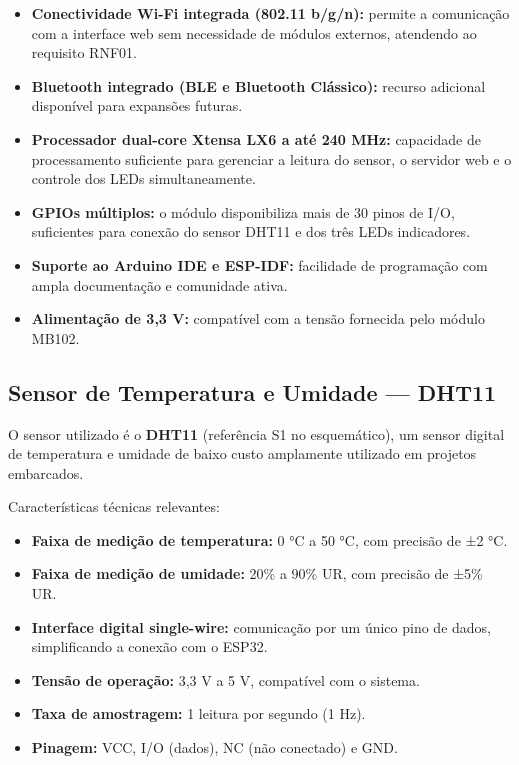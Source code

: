 \begin{itemize}
    \item \textbf{Conectividade Wi-Fi integrada (802.11 b/g/n):} permite a comunicação
    com a interface web sem necessidade de módulos externos, atendendo ao requisito RNF01.

    \item \textbf{Bluetooth integrado (BLE e Bluetooth Clássico):} recurso adicional
    disponível para expansões futuras.

    \item \textbf{Processador dual-core Xtensa LX6 a até 240 MHz:} capacidade de
    processamento suficiente para gerenciar a leitura do sensor, o servidor web e
    o controle dos LEDs simultaneamente.

    \item \textbf{GPIOs múltiplos:} o módulo disponibiliza mais de 30 pinos de I/O,
    suficientes para conexão do sensor DHT11 e dos três LEDs indicadores.

    \item \textbf{Suporte ao Arduino IDE e ESP-IDF:} facilidade de programação com
    ampla documentação e comunidade ativa.

    \item \textbf{Alimentação de 3,3 V:} compatível com a tensão fornecida pelo módulo
    MB102.
\end{itemize}

\subsection{Sensor de Temperatura e Umidade — DHT11}

O sensor utilizado é o \textbf{DHT11} (referência S1 no esquemático), um sensor digital
de temperatura e umidade de baixo custo amplamente utilizado em projetos embarcados.

Características técnicas relevantes:

\begin{itemize}
    \item \textbf{Faixa de medição de temperatura:} 0 °C a 50 °C, com precisão de ±2 °C.
    \item \textbf{Faixa de medição de umidade:} 20\% a 90\% UR, com precisão de ±5\% UR.
    \item \textbf{Interface digital single-wire:} comunicação por um único pino de dados,
    simplificando a conexão com o ESP32.
    \item \textbf{Tensão de operação:} 3,3 V a 5 V, compatível com o sistema.
    \item \textbf{Taxa de amostragem:} 1 leitura por segundo (1 Hz).
    \item \textbf{Pinagem:} VCC, I/O (dados), NC (não conectado) e GND.
\end{itemize}

